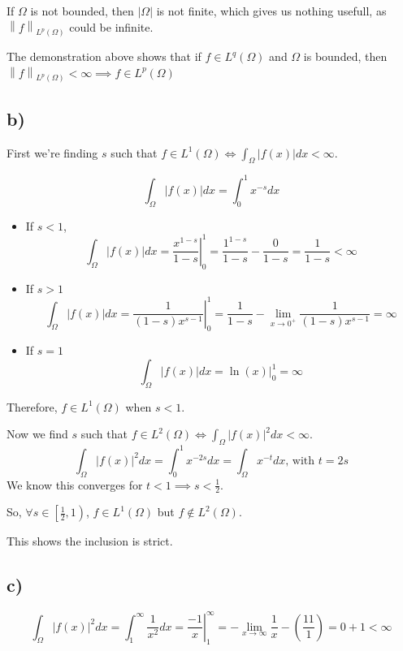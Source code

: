 \documentclass{article}
\newcommand{\normL}[2]{\left\lVert#1\right\rVert_{L^{#2}(\Omega)}}
\begin{document}
    If $\Omega$ is not bounded, then $|\Omega|$ is not finite, which gives us nothing usefull, as  $\normL{f}{p}$ could be infinite.

    The demonstration above shows that if  $f \in L^q(\Omega)$ and $\Omega$ is bounded, then $\normL{f}{p} < \infty \implies f \in L^p(\Omega)$


    \subsection*{b)}
    First we're finding $s$ such that $f \in L^1(\Omega) \iff \int_\Omega |f(x)| dx < \infty$.

    \[
        \int_\Omega |f(x)| dx = \int_{0}^{1} x^{-s} dx
    \]

    \begin{itemize}
        \item If $s < 1$, 
        \[
            \int_\Omega |f(x)|dx = \left. \frac{x^{1-s}}{1-s} \right|^1_0 = \frac{1^{1-s}}{1-s} - \frac{0}{1-s} = \frac{1}{1-s} < \infty 
        \] 

        \item If $s > 1$
        \[
            \int_\Omega |f(x)| dx = \left. \frac{1}{(1-s)x^{s-1}} \right|^1_0 =  \frac{1}{1-s} - \lim_{x \to 0^+} \frac{1}{(1-s)x^{s-1}} = \infty
        \]

        \item If $s = 1$
        \[
            \int_\Omega |f(x)| dx = \ln(x) |^1_0 = \infty
        \]
    \end{itemize}

    Therefore, $f \in L^1(\Omega)$ when $s<1$.

    Now we find $s$ such that $f \in L^2(\Omega) \iff \int_\Omega |f(x)|^2 dx < \infty$.
    \[
        \int_\Omega |f(x)|^2 dx = \int_{0}^{1} x^{-2s} dx = \int_\Omega x^{-t} dx \text{, with } t =2s
    \]
    We know this converges for $t<1 \implies s < \frac{1}{2}$.

    So, $\forall s \in \left[ \frac{1}{2}, 1\right)$, $f \in L^1(\Omega)$ but  $f \notin L^2(\Omega)$.

    This shows the inclusion is strict.

    \subsection*{c)}

    \[
        \int_\Omega |f(x)|^2 dx = \int_{1}^{\infty} \frac{1}{x^2} dx = \left. \frac{-1}{x} \right|^\infty_1 = -\lim_{x \to \infty} \frac{1}{x} - \left( \frac{11}{1} \right) = 0 + 1 < \infty
    \]
\end{document}
